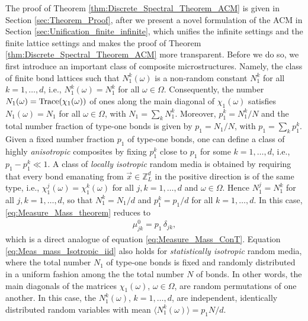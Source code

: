 \documentclass{cmslatex}
\begin{document}
The proof of Theorem \ref{thm:Discrete_Spectral_Theorem_ACM} is given
in Section \ref{sec:Theorem_Proof}, after we present a novel
formulation of the ACM in Section
\ref{sec:Unification_finite_infinite}, which unifies the infinite
settings and the finite lattice settings and makes the proof of
Theorem \ref{thm:Discrete_Spectral_Theorem_ACM} more
transparent. Before we do so, we first introduce an important class of
composite microstructures. Namely, the 
class of finite bond lattices such that $N_1^k(\omega)$ is a non-random
constant $N_1^k$ for all $k=1,\ldots,d$, i.e., $N_1^k(\omega)=N_1^k$ for all
$\omega\in\Omega$. Consequently, the number $N_1(\omega)={\rm Trace}(\chi_1(\omega))$ of ones
along the main diagonal of $\chi_1(\omega)$ satisfies $N_1(\omega)=N_1$ for all
$\omega\in\Omega$, with $N_1=\sum_kN_1^k$. Moreover, $p_1^k=N_1^k/N$ and the total number
fraction of type-one bonds is given by $p_1=N_1/N$, with
$p_1=\sum_kp_1^k$. Given a fixed number fraction $p_1$ of type-one 
bonds, one can define a class of highly \emph{anisotropic} composites
by fixing $p_1^k$ close to $p_1$ for some $k=1,\ldots,d$,
i.e., $p_1-p_1^k\ll1$. A class of \emph{locally isotropic} random media is 
obtained by requiring that every bond emanating from
$\vec{x}\in\mathbb{Z}^d_L$ in the positive direction is of the same
type, i.e., $\chi_1^j(\omega)=\chi_1^k(\omega)$ for all $j,k=1,\ldots,d$ and $\omega\in\Omega$. Hence
$N_1^j=N_1^k$ for all $j,k=1,\ldots,d$, so that $N_1^k=N_1/d$ and
$p_1^k=p_1/d$ for all $k=1,\ldots,d$. In this case, 
\eqref{eq:Measure_Mass_theorem} reduces to
% 
\begin{align}\label{eq:Meas_mass_Isotropic_iid}
  \mu_{jk}^0=p_1\,\delta_{jk},
\end{align}
%
which is a direct analogue of equation \eqref{eq:Measure_Mass_ConT}.
Equation \eqref{eq:Meas_mass_Isotropic_iid} also holds for
\emph{statistically isotropic} random media, where the total number
$N_1$ of type-one bonds is fixed and randomly distributed in a uniform
fashion among the the total number $N$ of bonds. In other words, the 
main diagonals of the matrices $\chi_1(\omega)$, $\omega\in\Omega$, are random
permutations of one another.  In this case, the
$N_1^k(\omega)$, $k=1,\ldots,d$, are independent, identically distributed random
variables with mean $\langle N_1^k(\omega)\rangle=p_1N/d$.
\end{document}
